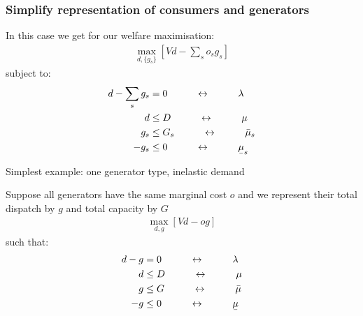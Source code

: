 \documentclass[10pt,aspectratio=169,dvipsnames]{beamer}
\def\l{\lambda}
\def\m{\mu}
\newcommand{\ubar}[1]{\text{\b{$#1$}}}
\begin{document}
\begin{frame}[fragile]
  \frametitle{Simplify representation of consumers and generators}

  In this case we get for our welfare maximisation:
  \begin{align*}
    \max_{d, \{g_s\} }\left[ Vd  -  \sum_s o_s g_s \right]
  \end{align*}
  subject to:
  \begin{align*}
    d -  \sum_s g_s  & = 0 \hspace{1cm} \leftrightarrow \hspace{1cm} \l \\
    d & \leq D  \hspace{1cm} \leftrightarrow \hspace{1cm} \m \\
        g_s  & \leq  G_s  \hspace{1cm}\leftrightarrow\hspace{1cm} \bar{\m}_s \\
    - g_s  & \leq  0  \hspace{1cm}\leftrightarrow\hspace{1cm} \ubar{\m}_s
  \end{align*}

\end{frame}



\begin{frame}{Simplest example: one generator type, inelastic demand}

  Suppose all generators have the same marginal cost $o$ and we
  represent their total dispatch by $g$ and total capacity by $G$
  \begin{align*}
    \max_{d, g }\left[ Vd  -  og\right]
  \end{align*}
  such that:
  \begin{align*}
    d - g & = 0  \hspace{1cm}\leftrightarrow\hspace{1cm} \l \\
    d & \leq D  \hspace{1cm} \leftrightarrow \hspace{1cm} \m \\
    g  & \leq  G  \hspace{1cm}\leftrightarrow\hspace{1cm} \bar{\m} \\
    - g  & \leq  0  \hspace{1cm}\leftrightarrow\hspace{1cm} \ubar{\m}
  \end{align*}

\end{frame}
\end{document}
